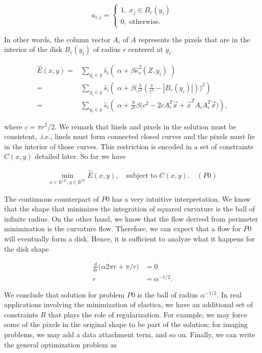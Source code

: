 \[
	a_{i,j} = \left\{ \begin{array}{ll}
		1,\; x_j \in B_r(y_i)\\
		0,\; \text{otherwise}.
	\end{array}\right.
\]

In other words, the column vector $A_i$ of $A$ represents the pixels that are in the interior of  the disk $B_r(y_i)$ of radius $r$ centered at $y_i$.


\begin{align}
	\hat{E}(x,y) =& \sum_{y_i \in y}{ \hat{s}_i\left(\; \alpha + \beta \hat{\kappa}_{r}^2(Z,y_i) \; \right)}\\\nonumber
			   =& \sum_{y_i \in y}{ \hat{s}_i \left(\; \alpha  + \beta \big( \frac{3}{r^3}(\frac{\pi}{r^2} - |B_r(y_i)|)\big)^2\right)}\\\nonumber
			   =& \sum_{y_i \in y}{ \hat{s}_i \left(\; \alpha + \frac{9}{r^6}\beta \big(c^2 - 2cA_i^T\vec{x} + \vec{x}^TA_iA_i^T\vec{x}\big)\right)},			   
	\end{align}
	
where $c =  \pi r^2/2$. We remark that linels and pixels in the solution must be consistent, .i.e., linels must form connected closed curves and the pixels must lie in the interior of those curves. This restriction is encoded in a set of constraints $C(x,y)$ detailed later. So far we have

\begin{align*}
	\min_{x \in \mathbb{B}^{|X|}, y \in \mathbb{B}^{|Y|}}{\hat{E}(x,y)}, \quad \text{subject to } C(x,y). \quad (P0)
\end{align*}

The continuous counterpart of $P0$ has a very intuitive interpretation. We know that the shape that minimizes the integration of squared curvature is the ball of infinite radius. On the other hand, we know that the flow derived from perimeter minimization is the curvature flow. Therefore, we can expect that a flow for $P0$ will eventually form a disk. Hence, it is sufficient to analyze what it happens for the disk shape

\begin{align*}
	\frac{d}{dr}\big( \alpha 2\pi r + \pi/r \big) &= 0\\
	r &= \alpha^{-1/2}.
\end{align*}  

We conclude that solution for problem $P0$ is the ball of radius $\alpha^{-1/2}$. In real applications involving the minimization of elastica, we have an additional set of constraints $R$ that plays the role of regularization. For example, we may force some of the pixels in the original shape to be part of the solution; for imaging problems, we may add a data attachment term, and so on. Finally, we can write the general optimization problem as

